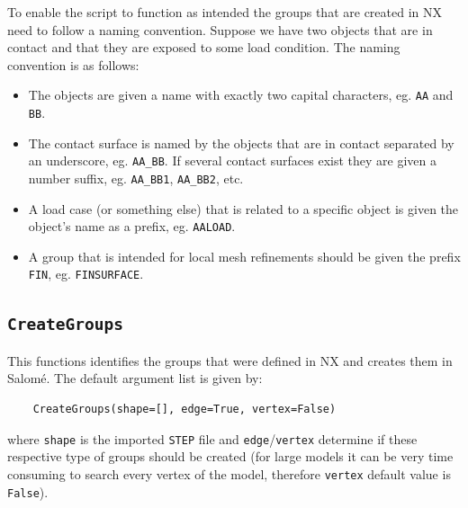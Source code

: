 \documentclass[10pt,a4paper,notitlepage]{scrartcl}
\begin{document}
To enable the script to function as intended the groups that are created in NX need to follow a naming convention. Suppose we have two objects that are in contact and that they are exposed to some load condition. The naming convention is as follows:
\begin{itemize}
	\item The objects are given a name with exactly two capital characters, eg. \texttt{AA} and \texttt{BB}.
	\item The contact surface is named by the objects that are in contact separated by an underscore, eg. \texttt{AA\_BB}. If several contact surfaces exist they are given a number suffix, eg. \texttt{AA\_BB1}, \texttt{AA\_BB2}, etc.
	\item A load case (or something else) that is related to a specific object is given the object's name as a prefix, eg. \texttt{AALOAD}.
	\item A group that is intended for local mesh refinements should be given the prefix \texttt{FIN}, eg. \texttt{FINSURFACE}.
\end{itemize}

\subsection*{\texttt{CreateGroups}} %
\label{sub:create_groups}
This functions identifies the groups that were defined in NX and creates them in Salomé. The default argument list is given by:
\begin{lstlisting}
	CreateGroups(shape=[], edge=True, vertex=False)
\end{lstlisting}
where \texttt{shape} is the imported \texttt{STEP} file and \texttt{edge}/\texttt{vertex} determine if these respective type of groups should be created (for large models it can be very time consuming to search every vertex of the model, therefore \texttt{vertex} default value is \texttt{False}).
\end{document}
